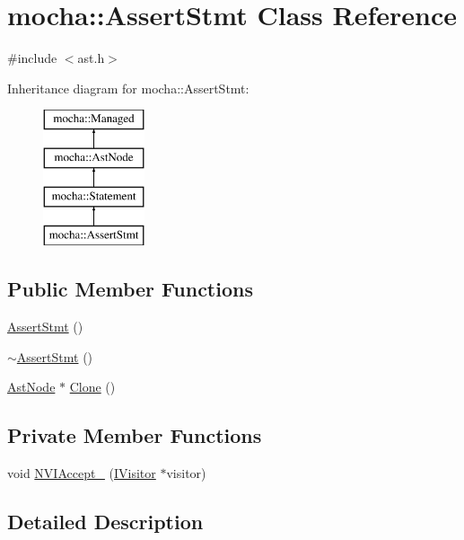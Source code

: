 \hypertarget{classmocha_1_1_assert_stmt}{
\section{mocha::AssertStmt Class Reference}
\label{classmocha_1_1_assert_stmt}
}


{\ttfamily \#include $<$ast.h$>$}

Inheritance diagram for mocha::AssertStmt:\begin{figure}[H]
\begin{center}
\leavevmode
\includegraphics[height=4.000000cm]{classmocha_1_1_assert_stmt}
\end{center}
\end{figure}
\subsection*{Public Member Functions}
\begin{DoxyCompactItemize}
\item 
\hyperlink{classmocha_1_1_assert_stmt_acb221a0eb1c2c2bc0d09cde71a0b078a}{AssertStmt} ()
\item 
\hyperlink{classmocha_1_1_assert_stmt_ad1389fe533696aef4d6c51e4271ac517}{$\sim$AssertStmt} ()
\item 
\hyperlink{classmocha_1_1_ast_node}{AstNode} $\ast$ \hyperlink{classmocha_1_1_assert_stmt_a25c698181a11aa2213db0ff12b01d4be}{Clone} ()
\end{DoxyCompactItemize}
\subsection*{Private Member Functions}
\begin{DoxyCompactItemize}
\item 
void \hyperlink{classmocha_1_1_assert_stmt_a49e173e8f338612c594af47c06b650fa}{NVIAccept\_\-} (\hyperlink{classmocha_1_1_i_visitor}{IVisitor} $\ast$visitor)
\end{DoxyCompactItemize}


\subsection{Detailed Description}


